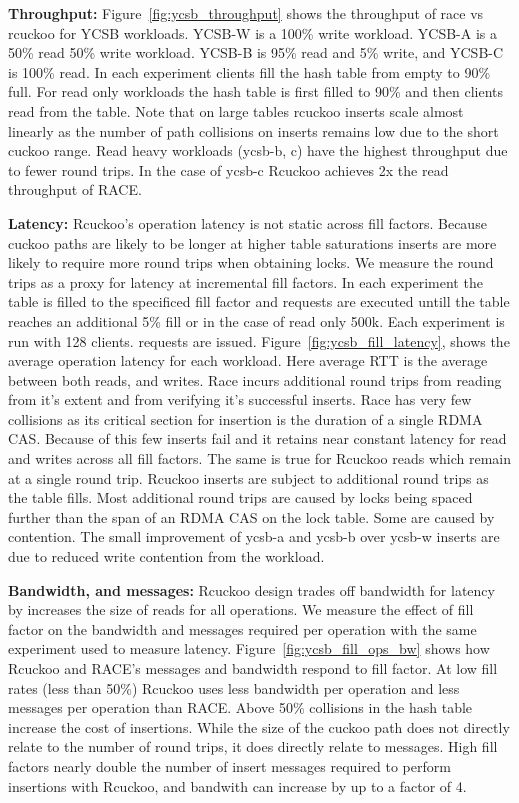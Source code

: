\textbf{Throughput:} Figure~\ref{fig:ycsb_throughput} shows
the throughput of race vs rcuckoo for YCSB workloads. YCSB-W
is a 100\% write workload. YCSB-A is a 50\% read 50\% write
workload. YCSB-B is 95\% read and 5\% write, and YCSB-C is
100\% read.  In each experiment clients fill the hash table
from empty to 90\% full. For read only workloads the hash
table is first filled to 90\% and then clients read from the
table.  Note that on large tables rcuckoo inserts scale
almost linearly as the number of path collisions on inserts
remains low due to the short cuckoo range.  Read heavy
workloads (ycsb-b, c) have the highest throughput due to
fewer round trips. In the case of ycsb-c Rcuckoo achieves 2x
the read throughput of RACE.

\textbf{Latency:} Rcuckoo's operation latency is not static
across fill factors. Because cuckoo paths are likely to be
longer at higher table saturations inserts are more likely
to require more round trips when obtaining locks. We measure
the round trips as a proxy for latency at incremental fill
factors. In each experiment the table is filled to the
specificed fill factor and requests are executed untill the
table reaches an additional 5\% fill or in the case of read
only 500k. Each experiment is run with 128 clients.
requests are issued. 
Figure~\ref{fig:ycsb_fill_latency}, shows the average
operation latency for each workload. Here average RTT is the
average between both reads, and writes. Race incurs
additional round trips from reading from it's extent and
from verifying it's successful inserts. Race has very few
collisions as its critical section for insertion is the
duration of a single RDMA CAS. Because of this few inserts
fail and it retains near constant latency for read and
writes across all fill factors. The same is true for Rcuckoo
reads which remain at a single round trip. Rcuckoo inserts
are subject to additional round trips as the table fills.
Most additional round trips are caused by locks being spaced
further than the span of an RDMA CAS on the lock table. Some
are caused by contention. The small improvement of ycsb-a
and ycsb-b over ycsb-w inserts are due to reduced write
contention from the workload.

\textbf{Bandwidth, and messages:} Rcuckoo design trades off
bandwidth for latency by increases the size of reads for all
operations. We measure the effect of fill factor on the
bandwidth and messages required per operation with the same
experiment used to measure latency.
Figure~\ref{fig:ycsb_fill_ops_bw} shows how Rcuckoo and
RACE's messages and bandwidth respond to fill factor. At low
fill rates (less than 50\%) Rcuckoo uses less bandwidth per operation
and less messages per operation than RACE. Above 50\%
collisions in the hash table increase the cost of
insertions. While the size of the cuckoo path does not
directly relate to the number of round trips, it does
directly relate to messages. High fill factors nearly double
the number of insert messages required to perform insertions
with Rcuckoo, and bandwith can increase by up to a factor of
4. 

